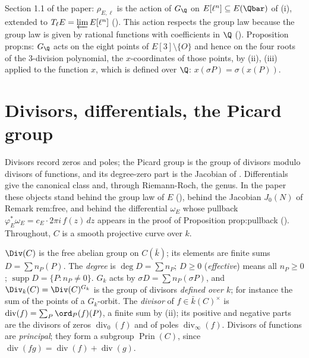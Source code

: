 \begin{paperlink}\label{pl:curves:galois}
Section 1.1 of the paper: $\rho_{E,\ell}$ is the action of $G_\Q$ on $E[\ell^n]\subseteq E(\Qbar)$ of (i), extended to
$T_\ell E=\varprojlim E[\ell^n]$ (). This action respects the group law because the group law is given by rational functions with
coefficients in $\Q$ (). Proposition prop:ns: $G_\Q$ acts on the eight points of $E[3]\setminus\{O\}$ and hence on the four
roots of the $3$-division polynomial, the $x$-coordinates of those points, by (ii), (iii) applied to the function $x$,
which is defined over $\Q$: $x(\sigma P)=\sigma(x(P))$.
\end{paperlink}

\section{Divisors, differentials, the Picard group}\label{sec:curves:divisors}

Divisors record zeros and poles; the Picard group is the group of divisors modulo divisors of functions, and its degree-zero part is the
Jacobian of . Differentials give the canonical class and, through Riemann-Roch, the genus. In the paper these
objects stand behind the group law of $E$ (), behind the Jacobian $J_0(N)$ of Remark rem:free, and behind the
differential $\omega_E$ whose pullback $\varphi_E^*\omega_E=c_E\cdot2\pi i\,f(z)\,dz$ appears in the proof of Proposition prop:pullback ().
Throughout, $C$ is a smooth projective curve over $k$.

\begin{definition}[divisors]\label{def:curves:divisor}
$\Div(C)$ is the free abelian group on $C(\bar k)$; its elements are finite sums $D=\sum n_P(P)$. The \emph{degree} is $\deg D=\sum n_P$; $D\ge0$
(\emph{effective}) means all $n_P\ge0$; $\operatorname{supp}D=\{P:n_P\ne0\}$. $G_k$ acts by $\sigma D=\sum n_P(\sigma P)$, and $\Div_k(C)=\Div(C)^{G_k}$ is the group
of divisors \emph{defined over $k$}; for instance the sum of the points of a $G_k$-orbit. The \emph{divisor} of $f\in\bar k(C)^\times$ is
$\operatorname{div}(f)=\sum_P\ord_P(f)(P)$, a finite sum by (ii); its positive and negative parts are the divisors of zeros
$\operatorname{div}_0(f)$ and of poles $\operatorname{div}_\infty(f)$. Divisors of functions are \emph{principal}; they form a subgroup $\operatorname{Prin}(C)$, since
$\operatorname{div}(fg)=\operatorname{div}(f)+\operatorname{div}(g)$.
\end{definition}

